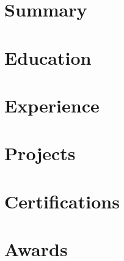 \documentclass[10pt, letterpaper]{article}
\begin{document}
	
	
	
	
	\section{\faAddressCard\ Summary}
	
	
	\section{\faUniversity\ Education}
	
	
	\section{\faBriefcase\ Experience}
	
	
	\section{\faCode\ Projects}
	
	
	\section{\faCertificate\ Certifications}
	
	
	\section{\faTrophy\ Awards}
	
	
\end{document}
